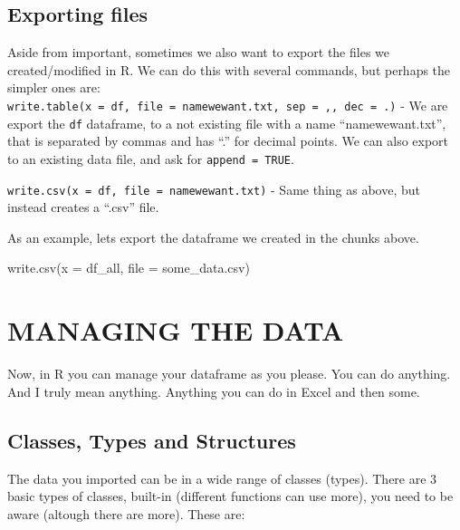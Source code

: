 \documentclass[
]{book}
\newenvironment{Shaded}{\begin{snugshade}}{\end{snugshade}}
\newcommand{\AttributeTok}[1]{\textcolor[rgb]{0.77,0.63,0.00}{#1}}
\newcommand{\FunctionTok}[1]{\textcolor[rgb]{0.00,0.00,0.00}{#1}}
\newcommand{\NormalTok}[1]{#1}
\newcommand{\StringTok}[1]{\textcolor[rgb]{0.31,0.60,0.02}{#1}}
\begin{document}
\hypertarget{exporting-files}{%
\section{Exporting files}\label{exporting-files}}

Aside from important, sometimes we also want to export the files we created/modified in R. We can do this with several commands, but perhaps the simpler ones are:\\
\texttt{write.table(x\ =\ df,\ file\ =\ \textquotesingle{}namewewant.txt\textquotesingle{},\ sep\ =\ \textquotesingle{},\textquotesingle{},\ dec\ =\ \textquotesingle{}.\textquotesingle{})} - We are export the \texttt{df} dataframe, to a not existing file with a name ``namewewant.txt'', that is separated by commas and has ``.'' for decimal points. We can also export to an existing data file, and ask for \texttt{append\ =\ TRUE}.

\texttt{write.csv(x\ =\ df,\ file\ =\ \textquotesingle{}namewewant.txt\textquotesingle{})} - Same thing as above, but instead creates a ``.csv'' file.

As an example, lets export the dataframe we created in the chunks above.

\begin{Shaded}
\begin{Highlighting}[]
\FunctionTok{write.csv}\NormalTok{(}\AttributeTok{x =}\NormalTok{ df\_all, }\AttributeTok{file =} \StringTok{\textquotesingle{}some\_data.csv\textquotesingle{}}\NormalTok{)}
\end{Highlighting}
\end{Shaded}

\hypertarget{managing-the-data}{%
\chapter{MANAGING THE DATA}\label{managing-the-data}}

Now, in R you can manage your dataframe as you please. You can do anything. And I truly mean anything. Anything you can do in Excel and then some.

\hypertarget{classes-types-and-structures}{%
\section{Classes, Types and Structures}\label{classes-types-and-structures}}

The data you imported can be in a wide range of classes (types). There are 3 basic types of classes, built-in (different functions can use more), you need to be aware (altough there are more). These are:
\end{document}
